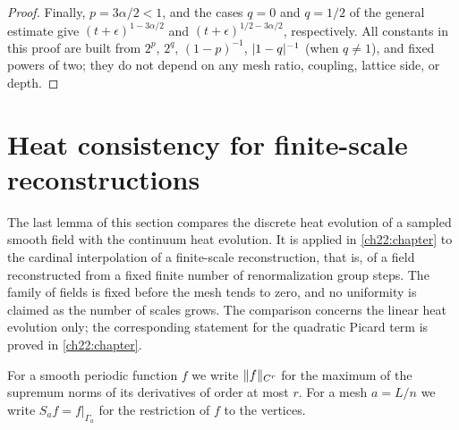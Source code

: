\begin{proof}
Finally, $p=3\alpha/2<1$, and the cases $q=0$ and $q=1/2$ of the general estimate give $(t+\epsilon)^{1-3\alpha/2}$ and $(t+\epsilon)^{1/2-3\alpha/2}$, respectively. All constants in this proof are built from $2^p$, $2^q$, $(1-p)^{-1}$, $\lvert 1-q\rvert^{-1}$ (when $q\ne1$), and fixed powers of two; they do not depend on any mesh ratio, coupling, lattice side, or depth.
\end{proof}

\section{Heat consistency for finite-scale reconstructions}\label{ch13:sec:consistency}

The last lemma of this section compares the discrete heat evolution of a sampled smooth field with the continuum heat evolution. It is applied in \cref{ch22:chapter} to the cardinal interpolation of a finite-scale reconstruction, that is, of a field reconstructed from a fixed finite number of renormalization group steps. The family of fields is fixed before the mesh tends to zero, and no uniformity is claimed as the number of scales grows. The comparison concerns the linear heat evolution only; the corresponding statement for the quadratic Picard term is proved in \cref{ch22:chapter}.

For a smooth periodic function $f$ we write $\lVert f\rVert_{C^r}$ for the maximum of the supremum norms of its derivatives of order at most $r$. For a mesh $a=L/n$ we write $S_af=f|_{\Gamma_a}$ for the restriction of $f$ to the vertices.


